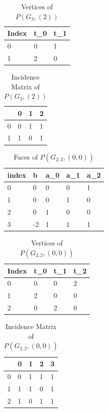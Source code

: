 \documentclass{article}
\begin{document}
\begin{table}[H]
	\centering
	\caption{Vertices of $P(G_3, (2))$}
	\label{G3Verts2}
	\begin{tabular}{@{}lll@{}}
		\toprule
		Index & t\_0 & t\_1 \\ \midrule
		0     & 0    & 1    \\
		1     & 2    & 0    \\ \bottomrule
	\end{tabular}
\end{table}

\begin{table}[H]
	\centering
	\caption{Incidence Matrix of $P(G_3, (2))$}
	\label{G3Inc2}
	\begin{tabular}{@{}llll@{}}
		\toprule
		& 0 & 1 & 2 \\ \midrule
		0 & 0 & 1 & 1 \\
		1 & 1 & 0 & 1 \\ \bottomrule
	\end{tabular}
\end{table}

\begin{table}[H]
	\centering
	\caption{Faces of $P(G_{2,2}, (0,0))$}
	\label{G22Faces}
	\begin{tabular}{@{}lllll@{}}
		\toprule
		index & b  & a\_0 & a\_1 & a\_2 \\ \midrule
		0     & 0  & 0    & 0    & 1    \\
		1     & 0  & 0    & 1    & 0    \\
		2     & 0  & 1    & 0    & 0    \\
		3     & -2 & 1    & 1    & 1    \\ \bottomrule
	\end{tabular}
\end{table}

\begin{table}[H]
	\centering
	\caption{Vertices of $P(G_{2,2}, (0,0))$}
	\label{G22Verts}
	\begin{tabular}{@{}llll@{}}
		\toprule
		Index & t\_0 & t\_1 & t\_2 \\ \midrule
		0     & 0    & 0    & 2    \\
		1     & 2    & 0    & 0    \\
		2     & 0    & 2    & 0    \\ \bottomrule
	\end{tabular}
\end{table}

\begin{table}[H]
	\centering
	\caption{Incidence Matrix of $P(G_{2,2}, (0, 0))$}
	\label{G22Inc}
	\begin{tabular}{@{}lllll@{}}
		\toprule
		& 0 & 1 & 2 & 3 \\ \midrule
		0 & 0 & 1 & 1 & 1 \\
		1 & 1 & 1 & 0 & 1 \\
		2 & 1 & 0 & 1 & 1 \\ \bottomrule
	\end{tabular}
\end{table}
\end{document}
